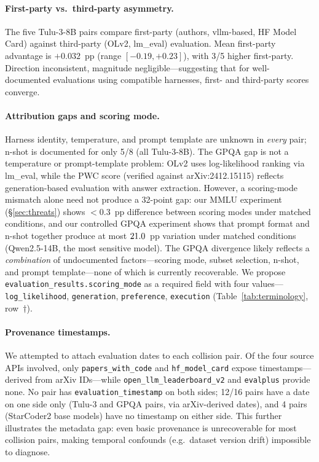 \documentclass[11pt]{article}
\begin{document}
\paragraph{First-party vs.\ third-party asymmetry.}
The five Tulu-3-8B pairs compare first-party (authors, vllm-based,
HF Model Card) against third-party (OLv2, lm\_eval) evaluation.
Mean first-party advantage is $+0.032$~pp (range $[-0.19, +0.23]$),
with 3/5 higher first-party. Direction inconsistent, magnitude
negligible---suggesting that for well-documented evaluations
using compatible harnesses, first- and third-party scores
converge.

\paragraph{Attribution gaps and scoring mode.}
Harness identity, temperature, and prompt template are unknown in
\emph{every} pair; n-shot is documented for only 5/8 (all
Tulu-3-8B).
The GPQA gap is not a temperature or prompt-template problem:
OLv2 uses log-likelihood ranking via lm\_eval, while the PWC
score (verified against arXiv:2412.15115) reflects
generation-based evaluation with answer extraction.
However, a scoring-mode mismatch alone need not produce a 32-point
gap: our MMLU experiment (\S\ref{sec:threats}) shows $<$0.3~pp
difference between scoring modes under matched conditions, and our
controlled GPQA experiment shows that prompt format and n-shot
together produce at most $21.0{}$~pp variation under matched
conditions (Qwen2.5-14B, the most sensitive model). The GPQA
divergence likely reflects a \emph{combination} of undocumented
factors---scoring mode, subset selection, n-shot, and prompt
template---none of which is currently recoverable.
We propose \texttt{evaluation\_results.scoring\_mode} as a required
field with four values---\texttt{log\_likelihood},
\texttt{generation}, \texttt{preference}, \texttt{execution}
(Table~\ref{tab:terminology}, row~$\dagger$).

\paragraph{Provenance timestamps.}
We attempted to attach evaluation dates to each collision pair.
Of the four source APIs involved, only \texttt{papers\_with\_code}
and \texttt{hf\_model\_card} expose timestamps---derived from
arXiv IDs---while \texttt{open\_llm\_leaderboard\_v2} and
\texttt{evalplus} provide none.
No pair has \texttt{evaluation\_timestamp} on both sides;
12/16 pairs have a date on one side only (Tulu-3 and GPQA pairs,
via arXiv-derived dates), and 4 pairs (StarCoder2 base models)
have no timestamp on either side.
This further illustrates the metadata gap: even basic provenance
is unrecoverable for most collision pairs, making temporal
confounds (e.g.\ dataset version drift) impossible to diagnose.
\end{document}
